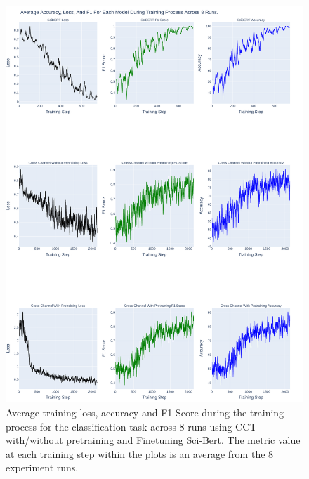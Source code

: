 \begin{figure}[p]
    \centering
    \includegraphics[width=\maxwidth{\textwidth}]{src/images/Loss-Distriubiton-Train-Set-2.pdf}
    \caption{Average training loss, accuracy and F1 Score during the training process for the classification task across 8 runs using CCT with/without pretraining and Finetuning Sci-Bert. The metric value at each training step within the plots is an average from the 8 experiment runs. }
    \label{figure\arabic{figurecounter}}
\end{figure}

